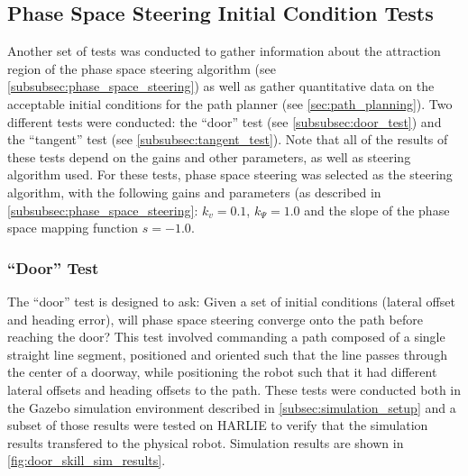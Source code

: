 \subsection{Phase Space Steering Initial Condition Tests}\label{subsec:phase_space_steering_skills}

Another set of tests was conducted to gather information about the attraction region of the phase space steering algorithm (see \autoref{subsubsec:phase_space_steering}) as well as gather quantitative data on the acceptable initial conditions for the path planner (see \autoref{sec:path_planning}). Two different tests were conducted: the ``door'' test (see \autoref{subsubsec:door_test}) and the ``tangent'' test (see \autoref{subsubsec:tangent_test}). Note that all of the results of these tests depend on the gains and other parameters, as well as steering algorithm used. For these tests, phase space steering was selected as the steering algorithm, with the following gains and parameters (as described in \autoref{subsubsec:phase_space_steering}: $k_v = 0.1$, $k_\Psi = 1.0$ and the slope of the phase space mapping function $s = -1.0$.

\subsubsection{``Door'' Test}\label{subsubsec:door_test}

The ``door'' test is designed to ask: Given a set of initial conditions (lateral offset and heading error), will phase space steering converge onto the path before reaching the door? This test involved commanding a path composed of a single straight line segment, positioned and oriented such that the line passes through the center of a doorway, while positioning the robot such that it had different lateral offsets and heading offsets to the path. These tests were conducted both in the Gazebo simulation environment described in \autoref{subsec:simulation_setup} and a subset of those results were tested on HARLIE to verify that the simulation results transfered to the physical robot. Simulation results are shown in \autoref{fig:door_skill_sim_results}.

